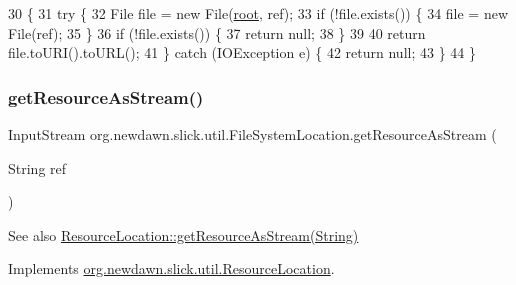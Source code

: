 \begin{DoxyCode}
30                                        \{
31         \textcolor{keywordflow}{try} \{
32             File file = \textcolor{keyword}{new} File(\mbox{\hyperlink{classorg_1_1newdawn_1_1slick_1_1util_1_1_file_system_location_a63b136315b940762412adc61596fb6cf}{root}}, ref);
33             \textcolor{keywordflow}{if} (!file.exists()) \{
34                 file = \textcolor{keyword}{new} File(ref);
35             \}
36             \textcolor{keywordflow}{if} (!file.exists()) \{
37                 \textcolor{keywordflow}{return} null;
38             \}
39             
40             \textcolor{keywordflow}{return} file.toURI().toURL();
41         \} \textcolor{keywordflow}{catch} (IOException e) \{
42             \textcolor{keywordflow}{return} null;
43         \}
44     \}
\end{DoxyCode}
\mbox{\label{classorg_1_1newdawn_1_1slick_1_1util_1_1_file_system_location_a01200401dca18c8a89c2e866abcc48a3}} 
\subsubsection{\texorpdfstring{get\+Resource\+As\+Stream()}{getResourceAsStream()}}
{\footnotesize\ttfamily Input\+Stream org.\+newdawn.\+slick.\+util.\+File\+System\+Location.\+get\+Resource\+As\+Stream (\begin{DoxyParamCaption}\item[{String}]{ref }\end{DoxyParamCaption})\hspace{0.3cm}{\ttfamily [inline]}}

\begin{DoxySeeAlso}{See also}
\mbox{\hyperlink{interfaceorg_1_1newdawn_1_1slick_1_1util_1_1_resource_location_a484bade425ef16b2230d28701b2c5e2f}{Resource\+Location\+::get\+Resource\+As\+Stream(\+String)}} 
\end{DoxySeeAlso}


Implements \mbox{\hyperlink{interfaceorg_1_1newdawn_1_1slick_1_1util_1_1_resource_location_a484bade425ef16b2230d28701b2c5e2f}{org.\+newdawn.\+slick.\+util.\+Resource\+Location}}.


